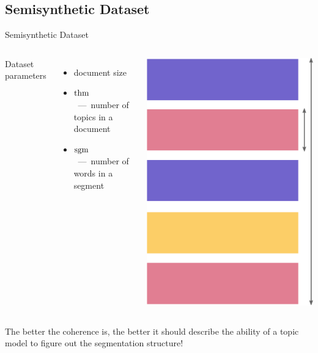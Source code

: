 \documentclass[russian]{beamer}
\begin{document}
\subsection{Semisynthetic Dataset}

\begin{frame}{Semisynthetic Dataset}
  \begin{columns}
    Dataset parameters
    \vspace{0.25cm}
    
    \begin{itemize}\setlength{\itemindent}{-1em} %
      \item document size
      \item $\operatorname{thm}$~---~number of topics in a document
      \item $\operatorname{sgm}$~---~number of words in a segment
    \end{itemize}
    
  
    \includegraphics[width=0.95\linewidth, height=0.6\textheight]{dataset} %
  \end{columns}
  
  \medskip
  
  \begin{block}{}
    The better the coherence is, the better it should describe the ability of a topic model to figure out the segmentation structure!
  \end{block}
\end{frame}
\end{document}
